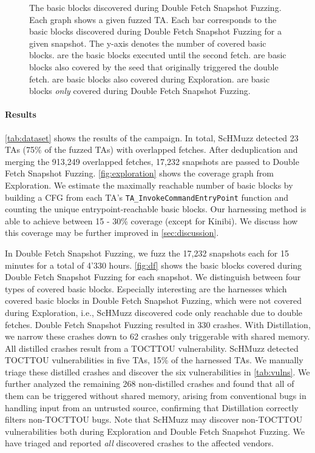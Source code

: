\documentclass[conference]{IEEEtran}
\newcommand{\sysname}{ScHMuzz\xspace}
\newcommand{\stageone}{Exploration\xspace}
\newcommand{\stagetwo}{Double Fetch Snapshot Fuzzing\xspace}
\newcommand{\stagethree}{Distillation\xspace}
\newcommand{\kinibi}{Kinibi\xspace}
\newcommand{\numTAsdf}{23\xspace}
\newcommand{\numdfs}{913,249\xspace}
\newcommand{\numdfsmerge}{17,232\xspace}
\newcommand{\numcrashes}{330\xspace}
\newcommand{\numcrashesdistill}{62\xspace}
\newcommand{\numvulns}{six\xspace}
\newcommand{\numvulnTAs}{five\xspace}
\begin{document}
\begin{figure}
\begin{tikzpicture}
    \end{tikzpicture}
    \caption{
        The basic blocks discovered during \stagetwo. Each graph shows a given fuzzed TA. Each bar corresponds to the basic blocks discovered during \stagetwo for a given snapshot. The y-axis denotes the number of covered basic blocks.  
    \protect{} are the basic blocks executed until the second fetch. 
    \protect{} are basic blocks also covered by the seed that originally triggered the double fetch. 
    \protect{} are basic blocks also covered during \stageone. 
    \protect{} are basic blocks \emph{only} covered during \stagetwo. 
    }
    \label{fig:df}
\end{figure}

\paragraph{Results}

\autoref{tab:dataset} shows the results of the campaign. In total, \sysname detected 
\numTAsdf{} TAs (75\% of the fuzzed TAs) with overlapped fetches. 
After deduplication and merging the \numdfs{} overlapped fetches, \numdfsmerge snapshots 
are passed to \stagetwo. \autoref{fig:exploration} shows the coverage graph from \stageone. 
We estimate the maximally reachable number of basic blocks by building a CFG from each TA's
\texttt{TA\_InvokeCommandEntryPoint} function and counting the unique entrypoint-reachable basic blocks. 
Our harnessing method is able to achieve between 15 - 30\% coverage (except for \kinibi). 
We discuss how this coverage may be further improved in \autoref{sec:discussion}.

In \stagetwo, we fuzz the \numdfsmerge snapshots each for 15 minutes for a total of 4'330 hours. 
\autoref{fig:df} shows the basic blocks covered during \stagetwo for each snapshot. 
We distinguish between four types of covered basic blocks. Especially interesting are the harnesses which covered basic blocks in \stagetwo, which 
were not covered during \stageone, i.e., \sysname discovered code only reachable due to double 
fetches. \stagetwo resulted in \numcrashes crashes. With \stagethree, we narrow these crashes down to \numcrashesdistill crashes only triggerable with shared memory. 
All distilled crashes result from a TOCTTOU vulnerability. \sysname detected TOCTTOU vulnerabilities 
in \numvulnTAs TAs, 15\% of the harnessed TAs.
We manually triage these distilled 
crashes and discover the \numvulns{} vulnerabilities in \autoref{tab:vulns}. 
We further analyzed the remaining 268 non-distilled crashes and found that all of them can be triggered without 
shared memory, arising from conventional bugs in handling input from an untrusted source, confirming that \stagethree 
correctly filters non-TOCTTOU bugs. Note that \sysname may discover non-TOCTTOU vulnerabilities both during 
\stageone and \stagetwo. We have triaged and reported \emph{all} discovered crashes to the affected vendors.
\end{document}
